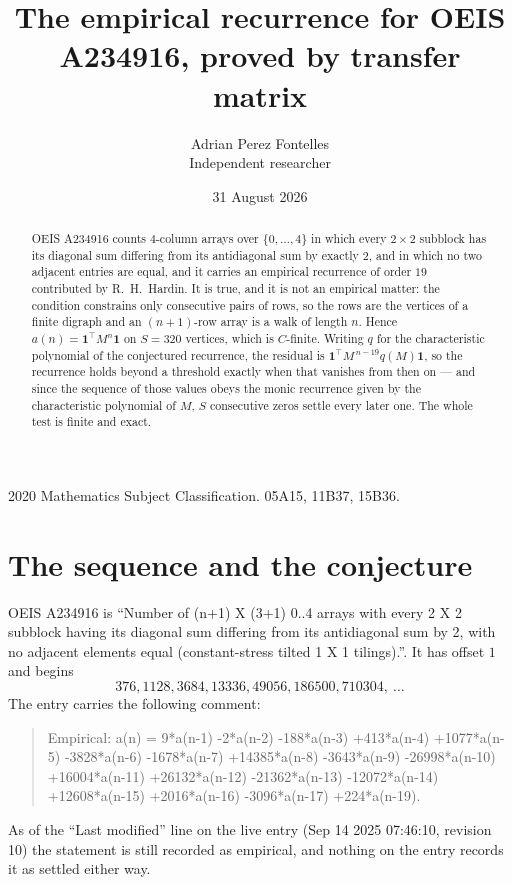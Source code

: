 \documentclass[11pt,a4paper]{article}
\title{The empirical recurrence for OEIS A234916, proved by transfer matrix}
\author{Adrian Perez Fontelles\\ \small Independent researcher}
\date{31 August 2026}
\theoremstyle{plain}
\theoremstyle{definition}
\begin{document}
\maketitle

\begin{abstract}
OEIS A234916 counts $4$-column arrays over $\{0,\dots,4\}$ in which every
$2\times2$ subblock has its diagonal sum differing from its antidiagonal sum by
exactly $2$, and in which no two adjacent entries are equal, and it
carries an empirical recurrence of order $19$ contributed by R.~H.~Hardin. It is true,
and it is not an empirical matter: the condition constrains only consecutive pairs of rows,
so the rows are the vertices of a finite digraph and an $(n+1)$-row array is a walk of
length $n$. Hence $a(n)=\mathbf{1}^{\!\top}M^{n}\mathbf{1}$ on $S=320$ vertices, which
is $C$-finite. Writing $q$ for the characteristic polynomial of the conjectured recurrence,
the residual is $\mathbf{1}^{\!\top}M^{\,n-19}q(M)\mathbf{1}$, so the recurrence
holds beyond a threshold exactly when that vanishes from then on --- and since the sequence
of those values obeys the monic recurrence given by the characteristic polynomial of $M$,
$S$ consecutive zeros settle every later one. The whole test is finite and exact.
\end{abstract}

\noindent\small 2020 Mathematics Subject Classification. 05A15, 11B37, 15B36.\normalsize

\section{The sequence and the conjecture}

OEIS A234916 is ``Number of (n+1) X (3+1) 0..4 arrays with every 2 X 2 subblock having its diagonal sum differing from its antidiagonal sum by 2, with no adjacent elements equal (constant-stress tilted 1 X 1 tilings).''. It has offset
$1$ and begins
\[
376, 1128, 3684, 13336, 49056, 186500, 710304,\ \dots
\]
The entry carries the following comment:
\begin{quote}\small
Empirical: a(n) = 9*a(n-1) -2*a(n-2) -188*a(n-3) +413*a(n-4) +1077*a(n-5) -3828*a(n-6) -1678*a(n-7) +14385*a(n-8) -3643*a(n-9) -26998*a(n-10) +16004*a(n-11) +26132*a(n-12) -21362*a(n-13) -12072*a(n-14) +12608*a(n-15) +2016*a(n-16) -3096*a(n-17) +224*a(n-19).
\end{quote}
As of the ``Last modified'' line on the live entry (Sep 14 2025 07:46:10, revision 10) the statement is
still recorded as empirical, and nothing on the entry records it as settled either way.
\end{document}
